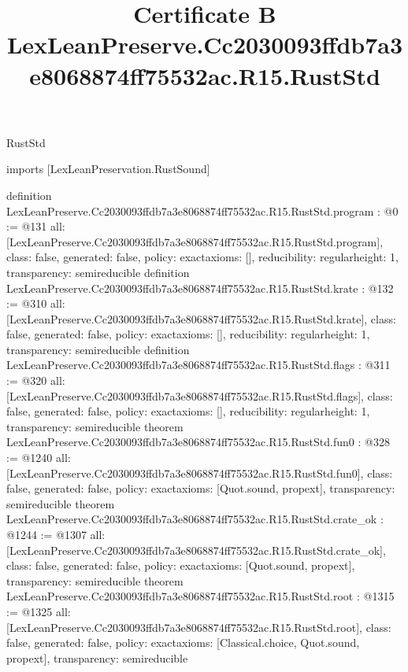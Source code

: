 \begin{lexlean}{RustStd}
\title{Certificate B LexLeanPreserve.Cc2030093ffdb7a3e8068874ff75532ac.R15.RustStd}
\begin{coremodule}
imports [LexLeanPreservation.RustSound]

definition LexLeanPreserve.Cc2030093ffdb7a3e8068874ff75532ac.R15.RustStd.program : @0 := @131 {
  all: [LexLeanPreserve.Cc2030093ffdb7a3e8068874ff75532ac.R15.RustStd.program],
  class: false,
  generated: false,
  policy: exact{axioms: []},
  reducibility: regular{height: 1},
  transparency: semireducible
}
definition LexLeanPreserve.Cc2030093ffdb7a3e8068874ff75532ac.R15.RustStd.krate : @132 := @310 {
  all: [LexLeanPreserve.Cc2030093ffdb7a3e8068874ff75532ac.R15.RustStd.krate],
  class: false,
  generated: false,
  policy: exact{axioms: []},
  reducibility: regular{height: 1},
  transparency: semireducible
}
definition LexLeanPreserve.Cc2030093ffdb7a3e8068874ff75532ac.R15.RustStd.flags : @311 := @320 {
  all: [LexLeanPreserve.Cc2030093ffdb7a3e8068874ff75532ac.R15.RustStd.flags],
  class: false,
  generated: false,
  policy: exact{axioms: []},
  reducibility: regular{height: 1},
  transparency: semireducible
}
theorem LexLeanPreserve.Cc2030093ffdb7a3e8068874ff75532ac.R15.RustStd.fun0 : @328 := @1240 {
  all: [LexLeanPreserve.Cc2030093ffdb7a3e8068874ff75532ac.R15.RustStd.fun0],
  class: false,
  generated: false,
  policy: exact{axioms: [Quot.sound, propext]},
  transparency: semireducible
}
theorem LexLeanPreserve.Cc2030093ffdb7a3e8068874ff75532ac.R15.RustStd.crate_ok : @1244 := @1307 {
  all: [LexLeanPreserve.Cc2030093ffdb7a3e8068874ff75532ac.R15.RustStd.crate_ok],
  class: false,
  generated: false,
  policy: exact{axioms: [Quot.sound, propext]},
  transparency: semireducible
}
theorem LexLeanPreserve.Cc2030093ffdb7a3e8068874ff75532ac.R15.RustStd.root : @1315 := @1325 {
  all: [LexLeanPreserve.Cc2030093ffdb7a3e8068874ff75532ac.R15.RustStd.root],
  class: false,
  generated: false,
  policy: exact{axioms: [Classical.choice, Quot.sound, propext]},
  transparency: semireducible
}


\end{coremodule}
\end{lexlean}
